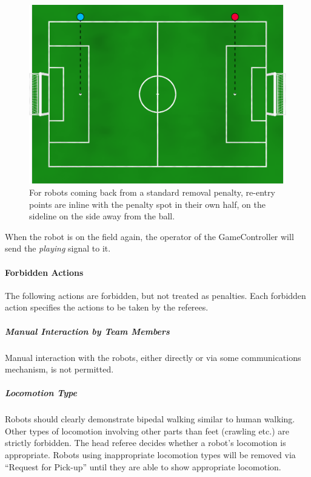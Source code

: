 \begin{figure}[t]
	\centerline{\includegraphics[width=\columnwidth]{figs/penalty_re-entry_points_2020.png}}
	\caption{For robots coming back from a standard removal penalty, re-entry points  are inline with the penalty spot in their own half, on the sideline on the side away from the ball.}
	\label{fig:penalty_re-entry_points}
\end{figure}

When the robot is on the field again, the operator of the GameController will send the \emph{playing} signal to it.

\paragraph{Forbidden Actions}

The following actions are forbidden, but not treated as penalties.
Each forbidden action specifies the actions to be taken by the referees.

\subparagraph{Manual Interaction by Team Members}

Manual interaction with the robots, either directly or via some communications mechanism, is not permitted.

\subparagraph{Locomotion Type}
\label{sec:locomotion_type}

Robots should clearly demonstrate bipedal walking similar to human walking. Other types of locomotion involving other parts than feet (crawling etc.) are strictly forbidden.
The head referee decides whether a robot's locomotion is appropriate. Robots using inappropriate locomotion types will be removed via ``Request for Pick-up'' until they are able to show appropriate locomotion.

